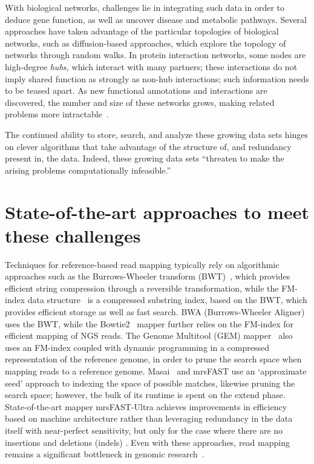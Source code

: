 \documentclass{acm_proc_article-sp}
\begin{document}
With biological networks, challenges lie in integrating such data in order to 
deduce gene function, as well as uncover disease and metabolic pathways.
Several approaches have taken advantage of the particular topologies of 
biological
networks, such as diffusion-based approaches, which explore the topology of
networks through random walks.
In protein interaction networks, some nodes are high-degree \emph{hubs,} which 
interact with
many partners; these interactions do not imply shared function as strongly as
non-hub interactions; such information needs to be teased apart.
As new functional annotations and interactions are discovered,
the number and size of these networks grows, making related problems more 
intractable~\cite{berger2013computational}.

The continued ability to store, search, and analyze these growing data sets hinges on
clever algorithms that take advantage of the structure of, and redundancy 
present in, the data.
Indeed, these growing data sets ``threaten to make the arising problems 
computationally infeasible.''~\cite{berger2013computational}

\section{State-of-the-art approaches to meet these challenges}

Techniques for reference-based read mapping typically rely on algorithmic 
approaches such as the Burrows-Wheeler transform (BWT)~\cite{berger2013computational}, 
which provides efficient string 
compression through a reversible transformation, while the FM-index data 
structure~\cite{berger2013computational} is a compressed substring index, 
based on the BWT, which provides efficient storage as well as fast search.
BWA (Burrows-Wheeler Aligner)~\cite{berger2013computational} uses the BWT, while the 
Bowtie2~\cite{berger2013computational} mapper further relies on the FM-index for 
efficient mapping of NGS reads.
The Genome Multitool (GEM) mapper~\cite{marco2012gem} also uses an FM-index 
coupled with dynamic programming in a compressed representation of the 
reference genome, in order to prune the search space 
when mapping reads to a reference genome.
Masai~\cite{siragusa2013fast} and mrsFAST \cite{berger2013computational} use an `approximate seed' approach to indexing
the space of possible matches, likewise pruning the search space; however, the
bulk of its runtime is spent on the extend phase.
State-of-the-art mapper mrsFAST-Ultra achieves improvements in efficiency based on machine architecture rather than leveraging redundancy in the data itself with near-perfect sensitivity, but
only for the case where there are no insertions and deletions (indels) \cite{hach2014mrsfast}.
Even with these approaches, read mapping remains a significant bottleneck in
genomic research~\cite{berger2013computational}.
\end{document}
